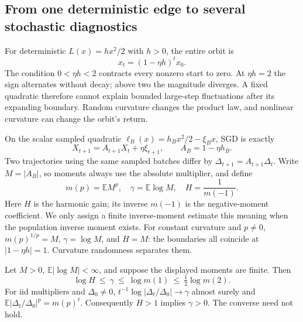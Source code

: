 
\subsection{From one deterministic edge to several stochastic diagnostics}
For deterministic $L(x)=hx^2/2$ with $h>0$, the entire orbit is
\begin{equation}
 x_t=(1-\eta h)^t x_0.
 \label{eq:deterministic}
\end{equation}
The condition $0<\eta h<2$ contracts every nonzero start to zero. At $\eta h=2$ the sign alternates without decay; above two the magnitude diverges. A fixed quadratic therefore cannot explain bounded large-step fluctuations after its expanding boundary. Random curvature changes the product law, and nonlinear curvature can change the orbit's return.

On the scalar sampled quadratic
\(\ell_B(x)=h_Bx^2/2-\xi_Bx\), SGD is exactly
\begin{equation}
 X_{t+1}=A_{t+1}X_t+\eta\xi_{t+1},\qquad A_B=1-\eta h_B.
 \label{sc:quadratic}
\end{equation}
Two trajectories using the same sampled batches differ by
\(\Delta_{t+1}=A_{t+1}\Delta_t\).
Write \(M=|A_B|\), so moments always use the absolute multiplier, and define
\begin{equation}
 m(p)=\mathbb E M^p,\quad
 \gamma=\mathbb E\log M,\quad
 H=\frac1{m(-1)}.
 \label{sc:diagnostics}
\end{equation}
Here \(H\) is the harmonic gain; its inverse \(m(-1)\) is the negative-moment
coefficient. We only assign a finite inverse-moment estimate this meaning
when the population inverse moment exists. For constant curvature and $p\ne0$,
\(m(p)^{1/p}=M\), \(\gamma=\log M\), and \(H=M\): the boundaries all
coincide at \(|1-\eta h|=1\). Curvature randomness separates them.

\begin{proposition}\label{sc:ordering}
Let \(M>0\), \(\mathbb E|\log M|<\infty\), and suppose the displayed moments
are finite. Then
\begin{equation}
 \log H\ \le\ \gamma\ \le\ \log m(1)\ \le\ \tfrac12\log m(2).
 \label{sc:ladder}
\end{equation}
For iid multipliers and \(\Delta_0\ne0\),
\(t^{-1}\log|\Delta_t/\Delta_0|\to\gamma\) almost surely and
\(\mathbb E|\Delta_t/\Delta_0|^p=m(p)^t\).
Consequently \(H>1\) implies \(\gamma>0\). The converse need not hold.
\end{proposition}

